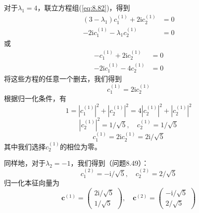 \begin{examplebox}
        对于$\lambda_1=4$，联立方程组(\ref{eq:8.82})，得到
        \begin{equation*}
            \begin{aligned}
                \left(3-\lambda_1\right)c_1^{\left(1\right)} + 2\mathrm{i}c_2^{\left(1\right)} &= 0 \\
                -2\mathrm{i}c_1^{\left(1\right)} - \lambda_1 c_2^{\left(1\right)} &= 0
            \end{aligned}
        \end{equation*}
        或
        \begin{equation*}
            \begin{aligned}
                -c_1^{\left(1\right)} + 2\mathrm{i}c_2^{\left(1\right)} &= 0 \\
                -2\mathrm{i}c_1^{\left(1\right)} - 4c_2^{\left(1\right)} &= 0
            \end{aligned}
        \end{equation*}
        将这些方程的任意一个删去，我们得到
        \begin{equation*}
            c_1^{\left(1\right)} = 2\mathrm{i}c_2^{\left(1\right)}
        \end{equation*}
        根据归一化条件，有
        \begin{equation*}
            1 = |c_1^{\left(1\right)}|^2 + |c_2^{\left(1\right)}|^2 = 4|c_2^{\left(1\right)}|^2 + |c_2^{\left(1\right)}|^2
        \end{equation*}
        \begin{equation*}
            \left|c_2^{\left(1\right)}\right|^2 = 1/\sqrt{5}, \quad c_2^{\left(1\right)} = 1/\sqrt{5}
        \end{equation*}
        \begin{equation*}
            c_1^{\left(1\right)} = 2\mathrm{i}c_2^{\left(1\right)} = 2\mathrm{i}/\sqrt{5}
        \end{equation*}
        其中我们选择$c_2^{\left(1\right)}$的相位为零。

        同样地，对于$\lambda_2 = -1$，我们得到（问题8.49）：
        \begin{equation*}
            c_1^{\left(2\right)} = -\mathrm{i}/\sqrt{5}, \quad c_2^{\left(2\right)} = 2/\sqrt{5}
        \end{equation*}
        归一化本征向量为
        \begin{equation*}
            \mathbf{c}^{\left(1\right)} = \begin{pmatrix}
                2\mathrm{i}/\sqrt{5} \\
                1/\sqrt{5}
            \end{pmatrix}, \quad \mathbf{c}^{\left(2\right)} = \begin{pmatrix}
                -\mathrm{i}/\sqrt{5} \\
                2/\sqrt{5}
            \end{pmatrix}
        \end{equation*}


\end{examplebox}
